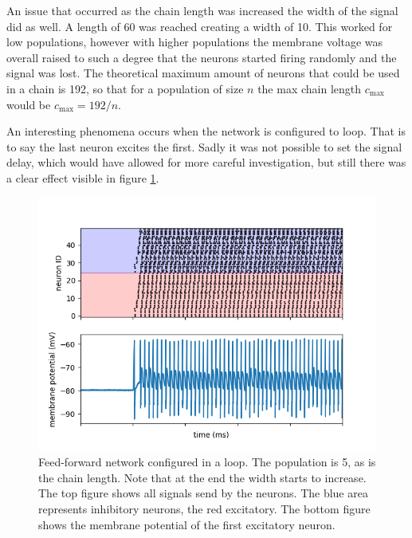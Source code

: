 \documentclass[a4paper,twocolumn]{article}
\begin{document}
An issue that occurred as the chain length was increased the width of the signal
did as well. A length of 60 was reached creating a width of 10. This worked for
low populations, however with higher populations the membrane voltage was
overall raised to such a degree that the neurons started firing randomly and the
signal was lost. The theoretical maximum amount of neurons that could be used in
a chain is 192, so that for a population of size $n$ the max chain length
$c_\text{max}$ would be $c_\text{max} = 192 / n$.

An interesting phenomena occurs when the network is configured to loop. That is
to say the last neuron excites the first. Sadly it was not possible to set the
signal delay, which would have allowed for more careful investigation, but still
there was a clear effect visible in figure \ref{fig:feed-forward-loop}.

\begin{figure}
    \centering
    \includegraphics[width=.5\textwidth]{figures/feedforward signals loop.png}
    \caption{Feed-forward network configured in a loop. The population is 5, as
        is the chain length. Note that at the end the width starts to increase.
        The top figure shows all signals send by the neurons. The blue area
        represents inhibitory neurons, the red excitatory. The bottom figure
        shows the membrane potential of the first excitatory neuron.}
    \label{fig:feed-forward-loop}
\end{figure}
\end{document}
